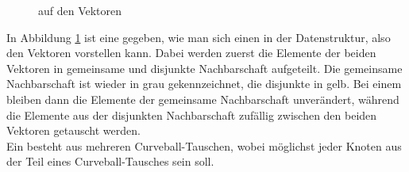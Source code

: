 %
%
%
%
%
\begin{figure}[h]
\centering
  \caption{\ct auf den Vektoren}
  \label{fig:curveball_trade_vector}
  
\end{figure}
%
%
%
%
In Abbildung \ref{fig:curveball_trade_vector} ist eine  gegeben, wie man sich einen
\ct in der Datenstruktur, also den Vektoren vorstellen kann. Dabei werden zuerst die Elemente
der beiden Vektoren in gemeinsame und disjunkte Nachbarschaft aufgeteilt. Die gemeinsame Nachbarschaft ist
wieder in grau gekennzeichnet, die disjunkte in gelb. Bei einem \ct bleiben dann die Elemente 
der gemeinsame Nachbarschaft unverändert, während die Elemente aus der disjunkten Nachbarschaft zufällig zwischen den beiden 
Vektoren getauscht werden.
\\
Ein  besteht aus mehreren Curveball-Tauschen, wobei möglichst jeder Knoten aus der 
Teil eines Curveball-Tausches sein soll.
%
%
% 
